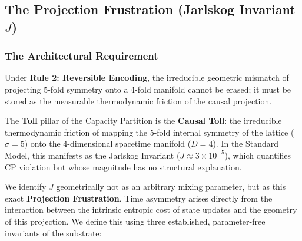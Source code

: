 \subsection{The Projection Frustration (Jarlskog Invariant \texorpdfstring{$J$}{J})}
\label{subsec:jarlskog}


\subsubsection{The Architectural Requirement}
Under \textbf{Rule 2: Reversible Encoding}, the irreducible geometric mismatch of projecting 5-fold symmetry onto a 4-fold manifold cannot be erased; it must be stored as the measurable thermodynamic friction of the causal projection.

The \textbf{Toll} pillar of the Capacity Partition is the \textbf{Causal Toll}: the irreducible thermodynamic friction of mapping the 5-fold internal symmetry of the lattice ($\sigma=5$) onto the 4-dimensional spacetime manifold ($D=4$). In the Standard Model, this manifests as the Jarlskog Invariant ($J \approx 3 \times 10^{-5}$), which quantifies CP violation but whose magnitude has no structural explanation.

We identify $J$ geometrically not as an arbitrary mixing parameter, but as this exact \textbf{Projection Frustration}. Time asymmetry arises directly from the interaction between the intrinsic entropic cost of state updates and the geometry of this projection. We define this using three established, parameter-free invariants of the substrate:

